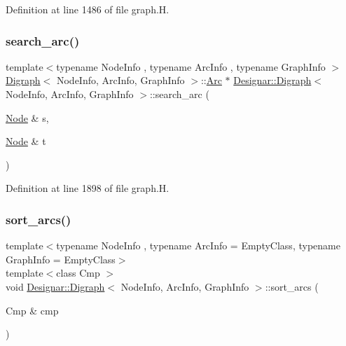 Definition at line 1486 of file graph.\+H.

\mbox{\label{class_designar_1_1_digraph_ac301ebe5d45b2864639d68d7e9aeea2a}} 
\subsubsection{\texorpdfstring{search\+\_\+arc()}{search\_arc()}}
{\footnotesize\ttfamily template$<$typename Node\+Info , typename Arc\+Info , typename Graph\+Info $>$ \\
\hyperlink{class_designar_1_1_digraph}{Digraph}$<$ Node\+Info, Arc\+Info, Graph\+Info $>$\+::\hyperlink{class_designar_1_1_digraph_a0ceb278671f2a535c00fddccdeafd69f}{Arc} $\ast$ \hyperlink{class_designar_1_1_digraph}{Designar\+::\+Digraph}$<$ Node\+Info, Arc\+Info, Graph\+Info $>$\+::search\+\_\+arc (\begin{DoxyParamCaption}\item[{\hyperlink{class_designar_1_1_digraph_a4dc921c41a480b7946a04170e997d8ae}{Node} \&}]{s,  }\item[{\hyperlink{class_designar_1_1_digraph_a4dc921c41a480b7946a04170e997d8ae}{Node} \&}]{t }\end{DoxyParamCaption})}



Definition at line 1898 of file graph.\+H.

\mbox{\label{class_designar_1_1_digraph_a450085493969a382371f7d4d407e42cd}} 
\subsubsection{\texorpdfstring{sort\+\_\+arcs()}{sort\_arcs()}\hspace{0.1cm}{\footnotesize\ttfamily [1/2]}}
{\footnotesize\ttfamily template$<$typename Node\+Info , typename Arc\+Info  = Empty\+Class, typename Graph\+Info  = Empty\+Class$>$ \\
template$<$class Cmp $>$ \\
void \hyperlink{class_designar_1_1_digraph}{Designar\+::\+Digraph}$<$ Node\+Info, Arc\+Info, Graph\+Info $>$\+::sort\+\_\+arcs (\begin{DoxyParamCaption}\item[{Cmp \&}]{cmp }\end{DoxyParamCaption})\hspace{0.3cm}{\ttfamily [inline]}}



